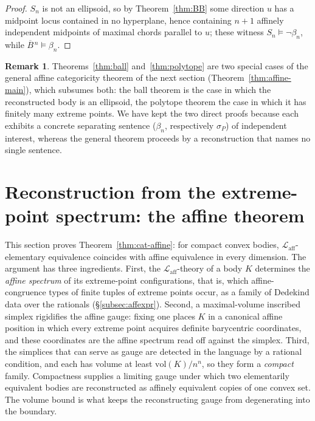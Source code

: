 \documentclass[11pt]{amsart}
\theoremstyle{definition}
\newtheorem{remark}[theorem]{Remark}
\newcommand{\Laff}{\mathcal{L}_{\mathrm{aff}}}
\newcommand{\Ball}{\overline{B}{}^{\,n}}
\begin{document}
\begin{proof}
$S_n$ is not an ellipsoid, so by Theorem~\ref{thm:BB} some direction $u$ has
a midpoint locus contained in no hyperplane, hence containing $n+1$ affinely
independent midpoints of maximal chords parallel to $u$; these witness
$S_n\models\neg\beta_n$, while $\Ball\models\beta_n$.
\end{proof}

\begin{remark}
Theorems~\ref{thm:ball} and~\ref{thm:polytope} are two special cases of the
general affine categoricity theorem of the next section
(Theorem~\ref{thm:affine-main}), which subsumes both: the ball theorem is the
case in which the reconstructed body is an ellipsoid, the polytope theorem
the case in which it has finitely many extreme points. We have kept the two
direct proofs because each exhibits a concrete separating sentence
($\beta_n$, respectively $\sigma_P$) of independent interest, whereas the
general theorem proceeds by a reconstruction that names no single sentence.
\end{remark}

\section{Reconstruction from the extreme-point spectrum: the affine theorem}
\label{sec:affine-proved}

This section proves Theorem~\ref{thm:cat-affine}: for compact convex
bodies, $\Laff$-elementary equivalence coincides with affine equivalence in
every dimension. The argument has three ingredients. First, the
$\Laff$-theory of a body $K$ determines the \emph{affine spectrum} of its
extreme-point configurations, that is, which affine-congruence types of finite
tuples of extreme points occur, as a family of Dedekind data over the
rationals (\S\ref{subsec:affexpr}). Second, a maximal-volume inscribed
simplex rigidifies the affine gauge: fixing one places $K$ in a canonical
affine position in which every extreme point acquires definite barycentric
coordinates, and these coordinates are the affine spectrum read off against
the simplex. Third, the simplices that can serve as gauge are detected in the
language by a rational condition, and each has volume at least
$\mathrm{vol}(K)/n^{n}$, so they form a \emph{compact} family. Compactness
supplies a limiting gauge under which two elementarily equivalent bodies are
reconstructed as affinely equivalent copies of one convex set. The volume
bound is what keeps the reconstructing gauge from degenerating into the
boundary.
\end{document}
